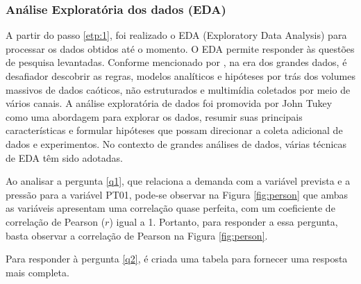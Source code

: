 \subsubsection{An\'alise Explorat\'oria dos dados (EDA)}

A partir do passo \ref{etp:1}, foi realizado o EDA (Exploratory Data Analysis) para processar os dados obtidos até o momento. O EDA permite responder às questões de pesquisa levantadas. Conforme mencionado por , na era dos grandes dados, é desafiador descobrir as regras, modelos analíticos e hipóteses por trás dos volumes massivos de dados caóticos, não estruturados e multimídia coletados por meio de vários canais. A análise exploratória de dados foi promovida por John Tukey como uma abordagem para explorar os dados, resumir suas principais características e formular hipóteses que possam direcionar a coleta adicional de dados e experimentos. No contexto de grandes análises de dados, várias técnicas de EDA têm sido adotadas.

Ao analisar a pergunta \ref{q1}, que relaciona a demanda com a variável prevista e a pressão para a variável PT01, pode-se observar na Figura \ref{fig:person} que ambas as variáveis apresentam uma correlação quase perfeita, com um coeficiente de correlação de Pearson ($r$) igual a 1. Portanto, para responder a essa pergunta, basta observar a correlação de Pearson na Figura \ref{fig:person}.

Para responder à pergunta \ref{q2}, é criada uma tabela para fornecer uma resposta mais completa.


